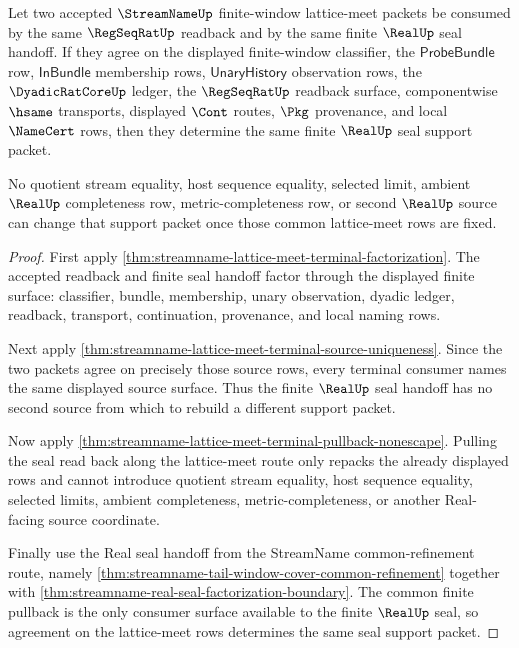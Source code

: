 \begin{theorem}
\label{thm:streamname-lattice-meet-real-seal-support-determinacy}
Let two accepted $\StreamNameUp$ finite-window lattice-meet packets be consumed
by the same $\RegSeqRatUp$ readback and by the same finite $\RealUp$ seal
handoff. If they agree on the displayed finite-window classifier, the
$\mathsf{ProbeBundle}$ row, $\mathsf{InBundle}$ membership rows,
$\mathsf{UnaryHistory}$ observation rows, the $\DyadicRatCoreUp$ ledger, the
$\RegSeqRatUp$ readback surface, componentwise $\hsame$ transports, displayed
$\Cont$ routes, $\Pkg$ provenance, and local $\NameCert$ rows, then they
determine the same finite $\RealUp$ seal support packet.

No quotient stream equality, host sequence equality, selected limit, ambient
$\RealUp$ completeness row, metric-completeness row, or second $\RealUp$ source
can change that support packet once those common lattice-meet rows are fixed.
\end{theorem}
\begin{proof}
First apply
\autoref{thm:streamname-lattice-meet-terminal-factorization}. The accepted
readback and finite seal handoff factor through the displayed finite surface:
classifier, bundle, membership, unary observation, dyadic ledger, readback,
transport, continuation, provenance, and local naming rows.

Next apply
\autoref{thm:streamname-lattice-meet-terminal-source-uniqueness}. Since the two
packets agree on precisely those source rows, every terminal consumer names the
same displayed source surface. Thus the finite $\RealUp$ seal handoff has no
second source from which to rebuild a different support packet.

Now apply
\autoref{thm:streamname-lattice-meet-terminal-pullback-nonescape}. Pulling the
seal read back along the lattice-meet route only repacks the already displayed
rows and cannot introduce quotient stream equality, host sequence equality,
selected limits, ambient completeness, metric-completeness, or another
Real-facing source coordinate.

Finally use the Real seal handoff from the StreamName common-refinement route,
namely \autoref{thm:streamname-tail-window-cover-common-refinement} together
with \autoref{thm:streamname-real-seal-factorization-boundary}. The common
finite pullback is the only consumer surface available to the finite
$\RealUp$ seal, so agreement on the lattice-meet rows determines the same seal
support packet.
\end{proof}

